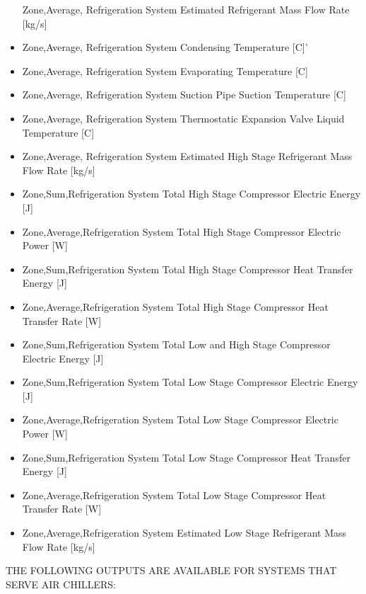 \begin{itemize}
  Zone,Average, Refrigeration System Estimated Refrigerant Mass Flow Rate {[}kg/s{]}
\item
  Zone,Average, Refrigeration System Condensing Temperature {[}C{]}'
\item
  Zone,Average, Refrigeration System Evaporating Temperature {[}C{]}
\item
  Zone,Average, Refrigeration System Suction Pipe Suction Temperature {[}C{]}
\item
  Zone,Average, Refrigeration System Thermostatic Expansion Valve Liquid Temperature {[}C{]}
\item
  Zone,Average, Refrigeration System Estimated High Stage Refrigerant Mass Flow Rate {[}kg/s{]}
\item
  Zone,Sum,Refrigeration System Total High Stage Compressor Electric Energy {[}J{]}
\item
  Zone,Average,Refrigeration System Total High Stage Compressor Electric Power {[}W{]}
\item
  Zone,Sum,Refrigeration System Total High Stage Compressor Heat Transfer Energy {[}J{]}
\item
  Zone,Average,Refrigeration System Total High Stage Compressor Heat Transfer Rate {[}W{]}
\item
  Zone,Sum,Refrigeration System Total Low and High Stage Compressor Electric Energy {[}J{]}
\item
  Zone,Sum,Refrigeration System Total Low Stage Compressor Electric Energy {[}J{]}
\item
  Zone,Average,Refrigeration System Total Low Stage Compressor Electric Power {[}W{]}
\item
  Zone,Sum,Refrigeration System Total Low Stage Compressor Heat Transfer Energy {[}J{]}
\item
  Zone,Average,Refrigeration System Total Low Stage Compressor Heat Transfer Rate {[}W{]}
\item
  Zone,Average,Refrigeration System Estimated Low Stage Refrigerant Mass Flow Rate {[}kg/s{]}
\end{itemize}

THE FOLLOWING OUTPUTS ARE AVAILABLE FOR SYSTEMS THAT SERVE AIR CHILLERS:

